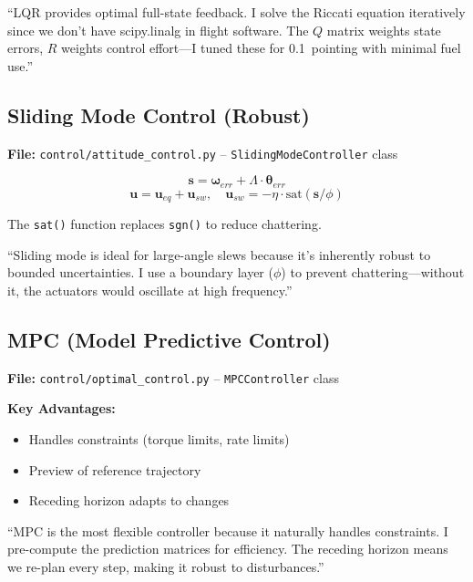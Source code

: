 \documentclass[11pt,a4paper]{article}
\begin{document}
\begin{interviewanswer}
``LQR provides optimal full-state feedback. I solve the Riccati equation iteratively since we don't have scipy.linalg in flight software. The $Q$ matrix weights state errors, $R$ weights control effort---I tuned these for 0.1\textdegree~pointing with minimal fuel use.''
\end{interviewanswer}

\subsection{Sliding Mode Control (Robust)}

\textbf{File:} \texttt{control/attitude\_control.py} -- \texttt{SlidingModeController} class

\begin{keyequation}
\[
\mathbf{s} = \boldsymbol{\omega}_{err} + \Lambda \cdot \boldsymbol{\theta}_{err}
\]
\[
\mathbf{u} = \mathbf{u}_{eq} + \mathbf{u}_{sw}, \quad \mathbf{u}_{sw} = -\eta \cdot \text{sat}(\mathbf{s}/\phi)
\]
\end{keyequation}

The \texttt{sat()} function replaces \texttt{sgn()} to reduce chattering.

\begin{interviewanswer}
``Sliding mode is ideal for large-angle slews because it's inherently robust to bounded uncertainties. I use a boundary layer ($\phi$) to prevent chattering---without it, the actuators would oscillate at high frequency.''
\end{interviewanswer}

\subsection{MPC (Model Predictive Control)}

\textbf{File:} \texttt{control/optimal\_control.py} -- \texttt{MPCController} class

\textbf{Key Advantages:}
\begin{itemize}[noitemsep]
    \item Handles constraints (torque limits, rate limits)
    \item Preview of reference trajectory
    \item Receding horizon adapts to changes
\end{itemize}

\begin{interviewanswer}
``MPC is the most flexible controller because it naturally handles constraints. I pre-compute the prediction matrices for efficiency. The receding horizon means we re-plan every step, making it robust to disturbances.''
\end{interviewanswer}
\end{document}
